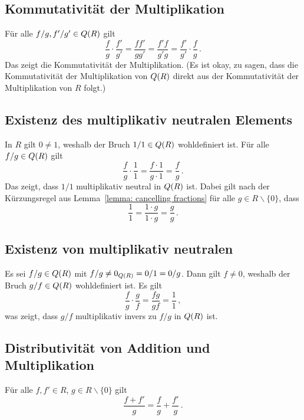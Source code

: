 \subsection*{Kommutativität der Multiplikation}

Für alle $f/g, f'/g' \in Q(R)$ gilt
\[
    \frac{f}{g} \cdot \frac{f'}{g'}
  = \frac{f f'}{g g'}
  = \frac{f' f}{g' g}
  = \frac{f'}{g'} \cdot \frac{f}{g} \,.
\]
Das zeigt die Kommutativität der Multiplikation.
(Es ist okay, zu sagen, dass die Kommutativität der Multiplikation von $Q(R)$ direkt aus der Kommutativität der Multiplikation von $R$ folgt.)





\subsection*{Existenz des multiplikativ neutralen Elements}

In $R$ gilt $0 \neq 1$, weshalb der Bruch $1/1 \in Q(R)$ wohldefiniert ist.
Für alle $f/g \in Q(R)$ gilt
\[
    \frac{f}{g} \cdot \frac{1}{1}
  = \frac{f \cdot 1}{g \cdot 1}
  = \frac{f}{g} \,.
\]
Das zeigt, dass $1/1$ multiplikativ neutral in $Q(R)$ ist.
Dabei gilt nach der Kürzungsregel aus Lemma~\ref{lemma: cancelling fractions} für alle $g \in R \smallsetminus \{0\}$, dass
\[
    \frac{1}{1}
  = \frac{1 \cdot g}{1 \cdot g}
  = \frac{g}{g} \,.
\]





\subsection*{Existenz von multiplikativ neutralen}

Es sei $f/g \in Q(R)$ mit $f/g \neq 0_{Q(R)} = 0/1 = 0/g$.
Dann gilt $f \neq 0$, weshalb der Bruch $g/f \in Q(R)$ wohldefiniert ist.
Es gilt
\[
    \frac{f}{g} \cdot \frac{g}{f}
  = \frac{fg}{gf}
  = \frac{1}{1} \,,
\]
was zeigt, dass $g/f$ multiplikativ invers zu $f/g$ in $Q(R)$ ist.





\subsection*{Distributivität von Addition und Multiplikation}

\begin{lemma}
  Für alle $f, f' \in R$, $g \in R \smallsetminus \{0\}$ gilt
  \[
    \frac{f + f'}{g} = \frac{f}{g} + \frac{f'}{g} \,.
  \]
\end{lemma}

